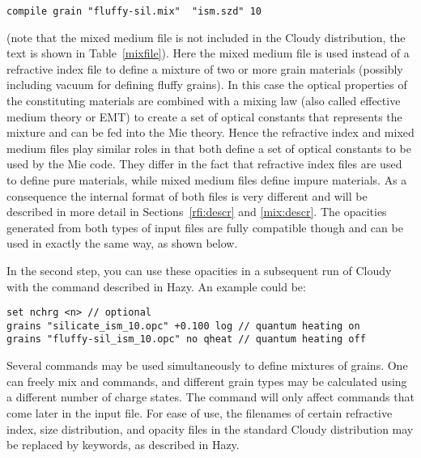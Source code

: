 \begin{verbatim}
compile grain "fluffy-sil.mix"  "ism.szd" 10
\end{verbatim}

\noindent (note that the mixed medium file  is not
included in the Cloudy distribution, the text is shown in
Table~\ref{mixfile}). Here the mixed medium file is used instead of a
refractive index file to define a mixture of two or more grain materials
(possibly including vacuum for defining fluffy grains). In this case the
optical properties of the constituting materials are combined with a mixing
law (also called effective medium theory or EMT) to create a set of optical
constants that represents the mixture and can be fed into the Mie theory.
Hence the refractive index and mixed medium files play similar roles in that
both define a set of optical constants to be used by the Mie code. They differ
in the fact that refractive index files are used to define pure materials,
while mixed medium files define impure materials. As a consequence the
internal format of both files is very different and will be described in more
detail in Sections~\ref{rfi:descr} and \ref{mix:descr}. The opacities
generated from both types of input files are fully compatible though and can
be used in exactly the same way, as shown below.

In the second step, you can use these opacities in a subsequent run of Cloudy
with the  command described in Hazy. An example could be:

\begin{verbatim}
set nchrg <n> // optional
grains "silicate_ism_10.opc" +0.100 log // quantum heating on
grains "fluffy-sil_ism_10.opc" no qheat // quantum heating off
\end{verbatim}

Several  commands may be used simultaneously to define
mixtures of grains. One can freely mix  and
 commands, and different grain types may be calculated using
a different number of charge states. The  command will
only affect  commands that come later in the input file. For
ease of use, the filenames of certain refractive index, size distribution, and
opacity files in the standard Cloudy distribution may be replaced by keywords,
as described in Hazy.


